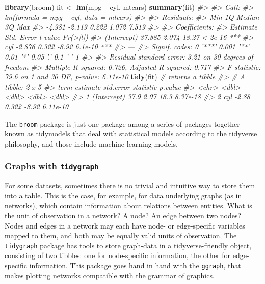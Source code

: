 \documentclass[]{book}
\newenvironment{Shaded}{}{}
\newcommand{\CommentTok}[1]{\textcolor[rgb]{0.38,0.63,0.69}{\textit{#1}}}
\newcommand{\KeywordTok}[1]{\textcolor[rgb]{0.00,0.44,0.13}{\textbf{#1}}}
\newcommand{\NormalTok}[1]{#1}
\newcommand{\OperatorTok}[1]{\textcolor[rgb]{0.40,0.40,0.40}{#1}}
\newcommand{\StringTok}[1]{\textcolor[rgb]{0.25,0.44,0.63}{#1}}
\begin{document}
\begin{Shaded}
\begin{Highlighting}[]
\KeywordTok{library}\NormalTok{(broom)}
\NormalTok{fit <-}\StringTok{ }\KeywordTok{lm}\NormalTok{(mpg }\OperatorTok{~}\StringTok{ }\NormalTok{cyl, mtcars)}
\KeywordTok{summary}\NormalTok{(fit)}
\CommentTok{#> }
\CommentTok{#> Call:}
\CommentTok{#> lm(formula = mpg ~ cyl, data = mtcars)}
\CommentTok{#> }
\CommentTok{#> Residuals:}
\CommentTok{#>    Min     1Q Median     3Q    Max }
\CommentTok{#> -4.981 -2.119  0.222  1.072  7.519 }
\CommentTok{#> }
\CommentTok{#> Coefficients:}
\CommentTok{#>             Estimate Std. Error t value Pr(>|t|)    }
\CommentTok{#> (Intercept)   37.885      2.074   18.27  < 2e-16 ***}
\CommentTok{#> cyl           -2.876      0.322   -8.92  6.1e-10 ***}
\CommentTok{#> ---}
\CommentTok{#> Signif. codes:  0 '***' 0.001 '**' 0.01 '*' 0.05 '.' 0.1 ' ' 1}
\CommentTok{#> }
\CommentTok{#> Residual standard error: 3.21 on 30 degrees of freedom}
\CommentTok{#> Multiple R-squared:  0.726,  Adjusted R-squared:  0.717 }
\CommentTok{#> F-statistic: 79.6 on 1 and 30 DF,  p-value: 6.11e-10}
\KeywordTok{tidy}\NormalTok{(fit) }\CommentTok{# returns a tibble}
\CommentTok{#> # A tibble: 2 x 5}
\CommentTok{#>   term        estimate std.error statistic  p.value}
\CommentTok{#>   <chr>          <dbl>     <dbl>     <dbl>    <dbl>}
\CommentTok{#> 1 (Intercept)    37.9      2.07      18.3  8.37e-18}
\CommentTok{#> 2 cyl            -2.88     0.322     -8.92 6.11e-10}
\end{Highlighting}
\end{Shaded}

The \texttt{broom} package is just one package among a series of packages together known as \href{https://www.tidymodels.org/}{tidymodels} that deal with statistical models according to the tidyverse philosophy, and those include machine learning models.

\hypertarget{graphs-with-tidygraph}{%
\subsubsection{\texorpdfstring{Graphs with \texttt{tidygraph}}{Graphs with tidygraph}}\label{graphs-with-tidygraph}}

For some datasets, sometimes there is no trivial and intuitive way to store them into a table. This is the case, for example, for data underlying graphs (as in networks), which contain information about relations between entities. What is the unit of observation in a network? A node? An edge between two nodes? Nodes and edges in a network may each have node- or edge-specific variables mapped to them, and both may be equally valid units of observation. The \href{https://www.data-imaginist.com/2017/introducing-tidygraph/}{\texttt{tidygraph}} package has tools to store graph-data in a tidyverse-friendly object, consisting of two tibbles: one for node-specific information, the other for edge-specific information. This package goes hand in hand with the \href{https://ggraph.data-imaginist.com/}{\texttt{ggraph}}, that makes plotting networks compatible with the grammar of graphics.
\end{document}
